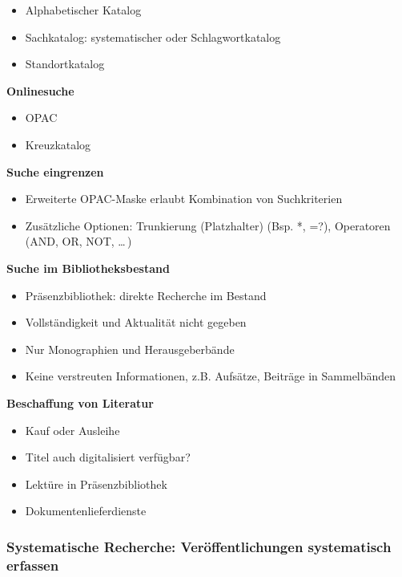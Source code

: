 \begin{itemize}%
\item
  Alphabetischer Katalog
\item
  Sachkatalog: systematischer oder Schlagwortkatalog
\item
  Standortkatalog
\end{itemize}

\textbf{Onlinesuche}

\begin{itemize}%
\item
  OPAC
\item
  Kreuzkatalog
\end{itemize}

\textbf{Suche eingrenzen}

\begin{itemize}%
\item
  Erweiterte OPAC-Maske erlaubt Kombination von Suchkriterien
\item
  Zusätzliche Optionen: Trunkierung (Platzhalter) (Bsp. *, =?),
  Operatoren (AND, OR, NOT, \frqq \ldots{}\flqq\,)
\end{itemize}

\textbf{Suche im Bibliotheksbestand}

\begin{itemize}%
\item
  Präsenzbibliothek: direkte Recherche im Bestand
\item
  Vollständigkeit und Aktualität nicht gegeben
\item
  Nur Monographien und Herausgeberbände
\item
  Keine verstreuten Informationen, z.B. Aufsätze, Beiträge in
  Sammelbänden
\end{itemize}

\textbf{Beschaffung von Literatur}

\begin{itemize}%
\item
  Kauf oder Ausleihe
\item
  Titel auch digitalisiert verfügbar?
\item
  Lektüre in Präsenzbibliothek
\item
  Dokumentenlieferdienste
\end{itemize}

\subsubsection{Systematische Recherche: Veröffentlichungen systematisch
erfassen}\label{systematische-recherche-veroeffentlichungen-systematisch-erfassen}

